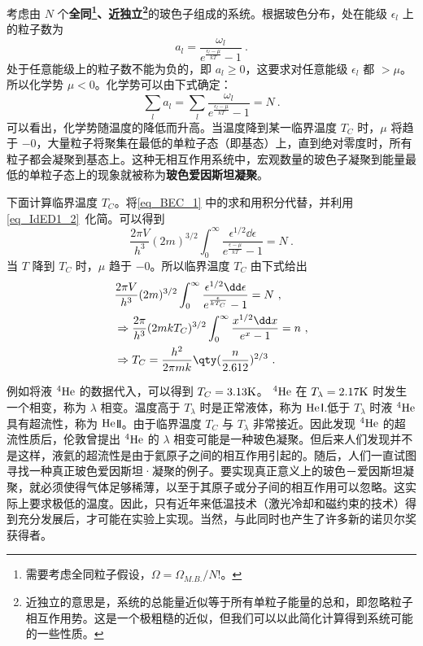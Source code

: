 

\begin{issues}
\issueDraft
\end{issues}


考虑由 $N$ 个\textbf{全同\footnote{需要考虑全同粒子假设，$\Omega=\Omega_{M.B.}/N!$。}、近独立\footnote{近独立的意思是，系统的总能量近似等于所有单粒子能量的总和，即忽略粒子相互作用势。这是一个极粗糙的近似，但我们可以以此简化计算得到系统可能的一些性质。}}的玻色子组成的系统。根据玻色分布，处在能级 $\epsilon_l$ 上的粒子数为
\begin{equation}
a_l=\frac{\omega_l}{e^{\frac{\epsilon_l-\mu}{kT}}-1}~.
\end{equation}
处于任意能级上的粒子数不能为负的，即 $a_l\ge 0$，这要求对任意能级 $\epsilon_l$ 都 $>\mu$。所以化学势 $\mu<0$。化学势可以由下式确定：
\begin{equation}\label{eq_BEC_1}
\sum_la_l=\sum_l \frac{\omega_l}{e^{\frac{\epsilon_l-\mu}{kT}}-1} =N~.
\end{equation}
可以看出，化学势随温度的降低而升高。当温度降到某一临界温度 $T_C$ 时，$\mu$ 将趋于 $-0$，大量粒子将聚集在最低的单粒子态（即基态）上，直到绝对零度时，所有粒子都会凝聚到基态上。这种无相互作用系统中，宏观数量的玻色子凝聚到能量最低的单粒子态上的现象就被称为\textbf{玻色爱因斯坦凝聚}。

下面计算临界温度 $T_C$。将\autoref{eq_BEC_1} 中的求和用积分代替，并利用\autoref{eq_IdED1_2}~化简。可以得到
\begin{equation}
\frac{2\pi V}{h^3}(2m)^{3/2}\int_0^\infty \frac{\epsilon^{1/2}\dd \epsilon}{e^{\frac{\epsilon-\mu}{kT}}-1}=N~.
\end{equation}
当 $T$ 降到 $T_C$ 时，$\mu$ 趋于 $-0$。所以临界温度 $T_C$ 由下式给出
\begin{equation}\label{eq_BEC_2}
\begin{aligned}
&\frac{2\pi V}{h^3}(2m)^{3/2}\int_0^\infty \frac{\epsilon^{1/2}\dd \epsilon}{e^{\frac{\epsilon}{kT_C}}-1}=N~,\\
&\Rightarrow \frac{2\pi}{h^3}(2mkT_C)^{3/2}\int_0^\infty \frac{x^{1/2}\dd x}{e^x-1}=n~,\\
&\Rightarrow T_C=\frac{h^2}{2\pi mk}\qty(\frac{n}{2.612})^{2/3}~.
\end{aligned}
\end{equation}


例如将液 $^4\rm{He}$ 的数据代入，可以得到 $T_C=3.13\rm{K}$。  $^4\rm{He}$ 在 $T_\lambda=2.17\rm{K}$ 时发生一个相变，称为 $\lambda$ 相变。温度高于 $T_\lambda$ 时是正常液体，称为 $\rm{He}$Ⅰ.低于 $T_\lambda$ 时液 $^4\rm{He}$ 具有超流性，称为 $\rm{He}$Ⅱ。由于临界温度 $T_C$ 与 $T_\lambda$ 非常接近。因此发现 $^4\rm{He}$ 的超流性质后，伦敦曾提出 $^4\rm{He}$ 的 $\lambda$ 相变可能是一种玻色凝聚。但后来人们发现并不是这样，液氦的超流性是由于氦原子之间的相互作用引起的。随后，人们一直试图寻找一种真正玻色爱因斯坦·凝聚的例子。要实现真正意义上的玻色－爱因斯坦凝聚，就必须使得气体足够稀薄，以至于其原子或分子间的相互作用可以忽略。这实际上要求极低的温度。因此，只有近年来低温技术（激光冷却和磁约束的技术）得到充分发展后，才可能在实验上实现。当然，与此同时也产生了许多新的诺贝尔奖获得者。

